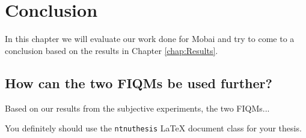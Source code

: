 \chapter{Conclusion}
\label{chap:Conclusion}
In this chapter we will evaluate our work done for Mobai and try to come to a conclusion based on the results in Chapter \ref{chap:Results}.

\section{How can the two FIQMs be used further?}
Based on our results from the subjective experiments, the two FIQMs...

You definitely should use the \texttt{ntnuthesis} \LaTeX{} document class for your thesis.
